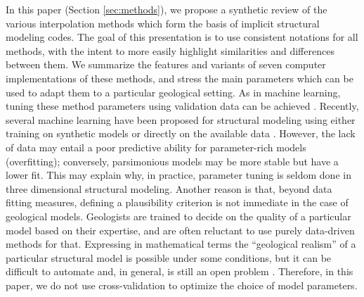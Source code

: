 \documentclass[preprint]{ring20}
\begin{document}
In this paper (Section \ref{sec:methods}), we propose a synthetic review of the various interpolation methods which form the basis of implicit structural modeling codes. The goal of this presentation is to use consistent notations for all methods, with the intent to more easily highlight similarities and differences between them. We summarize the features and variants of seven computer implementations of these methods, and stress the main parameters which can be used to adapt them to a particular geological setting. As in machine learning, tuning these method parameters using validation data can be achieved \citep{Goncalves2017CG}. Recently, several machine learning have been proposed for structural modeling using either training on synthetic models \citep{Bi2022GMD} or directly on the available data \citep{Hillier2021MG}. 
However, the lack of data may entail a poor predictive ability for parameter-rich models (overfitting); conversely, parsimonious models may be more stable but have a lower fit. This may explain why, in practice, parameter tuning is seldom done in three dimensional structural modeling. Another reason is that, beyond data fitting measures, defining a plausibility criterion is not immediate in the case of geological models. Geologists are trained to decide on the quality of a particular model based on their expertise, and are often reluctant to use purely data-driven methods for that. Expressing in mathematical terms the ``geological realism'' of a particular structural model is possible under some conditions, but it can be difficult to automate and, in general, is still an open problem \citep{Caumon2010MG,Jessell2010T}. Therefore, in this paper, we do not use cross-validation to optimize the choice of model parameters.
\end{document}
